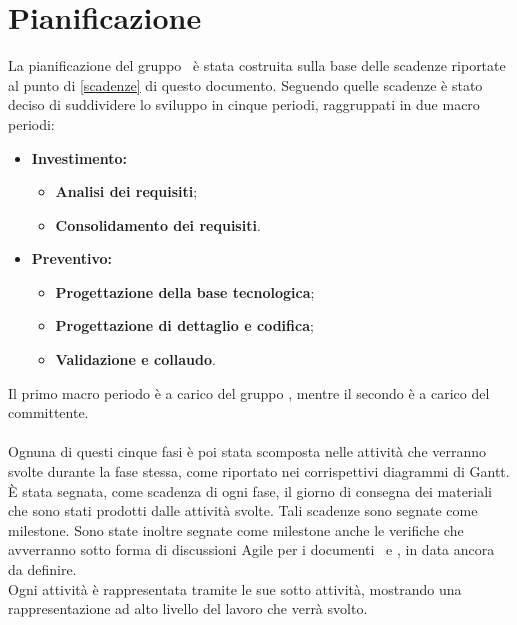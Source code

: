 \documentclass[PianoDiProgetto.tex]{subfiles}
\begin{document}
\chapter{Pianificazione}
La pianificazione del gruppo \gruppo\ è stata costruita sulla base delle scadenze riportate al punto di \ref{scadenze} di questo documento. Seguendo quelle scadenze è stato deciso di suddividere lo sviluppo in cinque periodi, raggruppati in due macro periodi:
\begin{itemize}
	\item \textbf{Investimento:}
		\begin{itemize}
			\item \textbf{Analisi dei requisiti};
			\item \textbf{Consolidamento dei requisiti}.
		\end{itemize}
	\item \textbf{Preventivo:}
		\begin{itemize}
			\item \textbf{Progettazione della base tecnologica};
			\item \textbf{Progettazione di dettaglio e codifica};
			\item \textbf{Validazione e collaudo}.
		\end{itemize}
\end{itemize}
Il primo macro periodo è a carico del gruppo \gruppo, mentre il secondo è a carico del committente.\\\\ %
Ognuna di questi cinque fasi è poi stata scomposta nelle attività che verranno svolte durante la fase stessa, come riportato nei corrispettivi diagrammi di Gantt. \`{E} stata segnata, come scadenza di ogni fase, il giorno di consegna dei materiali che sono stati prodotti dalle attività svolte. Tali scadenze sono segnate come milestone.
Sono state inoltre segnate come milestone anche le verifiche che avverranno sotto forma di discussioni Agile per i documenti \tb\ e \pb, in data ancora da definire.\\ Ogni attività è rappresentata tramite le sue sotto attività, mostrando una rappresentazione ad alto livello del lavoro che verrà svolto.
\newpage
\end{document}
